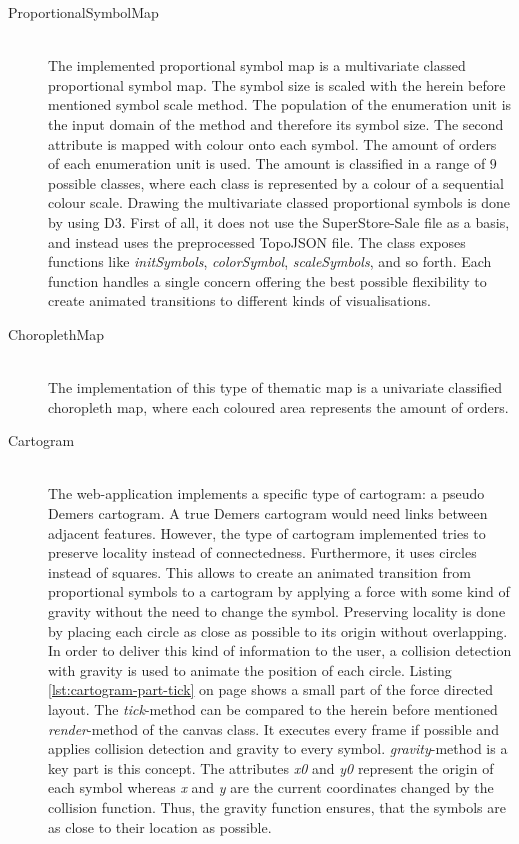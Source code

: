 \begin{description}
\begin{lstlisting}[language=JavaScript, caption={Particles on a dot map getting animated.}, label={lst:dot-draw-animated}]
\end{lstlisting}

\item[ProportionalSymbolMap] \hfill \\
The implemented proportional symbol map is a multivariate classed proportional symbol map. The symbol size is scaled with the herein before mentioned symbol scale method. The population of the enumeration unit is the input domain of the method and therefore its symbol size. The second attribute is mapped with colour onto each symbol. The amount of orders of each enumeration unit is used. The amount is classified in a range of $9$ possible classes, where each class is represented by a colour of a sequential colour scale.
Drawing the multivariate classed proportional symbols is done by using \ac{D3}. First of all, it does not use the SuperStore-Sale file as a basis, and instead uses the preprocessed TopoJSON file. The class exposes functions like \textit{initSymbols}, \textit{colorSymbol}, \textit{scaleSymbols}, and so forth. Each function handles a single concern offering the best possible flexibility to create animated transitions to different kinds of visualisations.

\item[ChoroplethMap] \hfill \\
The implementation of this type of thematic map is a univariate classified choropleth map, where each coloured area represents the amount of orders.

\item[Cartogram] \hfill \\
The web-application implements a specific type of cartogram: a pseudo Demers cartogram. A true Demers cartogram would need links between adjacent features. However, the type of cartogram implemented tries to preserve locality instead of connectedness. Furthermore, it uses circles instead of squares. This allows to create an animated transition from proportional symbols to a cartogram by applying a force with some kind of gravity without the need to change the symbol.
Preserving locality is done by placing each circle as close as possible to its origin without overlapping. In order to deliver this kind of information to the user, a collision detection with gravity is used to animate the position of each circle. Listing \ref{lst:cartogram-part-tick} on page \pageref{lst:cartogram-part-tick} shows a small part of the force directed layout. The \textit{tick}-method can be compared to the herein before mentioned \textit{render}-method of the canvas class. It executes every frame if possible and applies collision detection and gravity to every symbol. \textit{gravity}-method is a key part is this concept. The attributes \textit{x0} and \textit{y0} represent the origin of each symbol whereas \textit{x} and \textit{y} are the current coordinates changed by the collision function. Thus, the gravity function ensures, that the symbols are as close to their location as possible.


\end{description}
